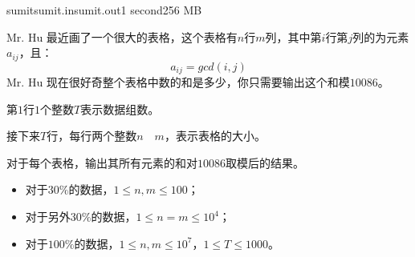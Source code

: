 \documentclass[11pt,a4paper,oneside]{article}
\begin{document}
\begin{problem}{sumit}{sumit.in}{sumit.out}{1 second}{256 MB}
	
	Mr. Hu 最近画了一个很大的表格，这个表格有$n$行$m$列，其中第$i$行第$j$列的为元素$a_{ij}$，且：
	$$
		a_{ij} = gcd(i,j)
	$$
	Mr. Hu 现在很好奇整个表格中数的和是多少，你只需要输出这个和模$10086$。

    \InputFile

	第$1$行$1$个整数$T$表示数据组数。

	接下来$T$行，每行两个整数$n \quad m$，表示表格的大小。
	
    \OutputFile
    
    对于每个表格，输出其所有元素的和对$10086$取模后的结果。
    
    \Example    
    \begin{example}
   \end{example}
   
   \Note
   
   \begin{itemize}
	   	\item 对于$30\%$的数据，$1 \leq n, m \leq 100$；
	   	\item 对于另外$30\%$的数据，$1 \leq n = m \leq 10^4$；
	   	\item 对于$100\%$的数据，$1 \leq n, m \leq 10^7$，$1 \leq T \leq 1000$。
   \end{itemize}
\end{problem}	
%	
%
%
%
%	
%    
%    
%   
%   
	
\end{document}
